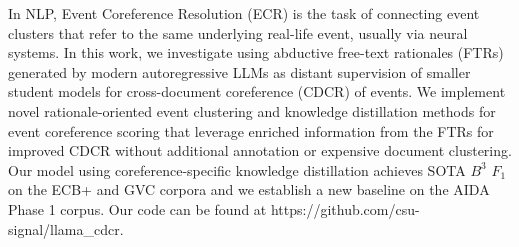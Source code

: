 In NLP, Event Coreference Resolution (ECR) is the task of connecting event clusters that refer to the same underlying real-life event, usually via neural systems. In this work, we investigate using abductive free-text rationales (FTRs) generated by modern autoregressive LLMs as distant supervision of smaller student models for cross-document coreference (CDCR) of events. We implement novel rationale-oriented event clustering and knowledge distillation methods for event coreference scoring that leverage enriched information from the FTRs for improved CDCR without additional annotation or expensive document clustering.  Our model using coreference-specific knowledge distillation achieves SOTA $B^3$ $F_1$ on the ECB+ and GVC corpora and we establish a new baseline on the AIDA Phase 1 corpus. Our code can be found at https://github.com/csu-signal/llama\_cdcr.